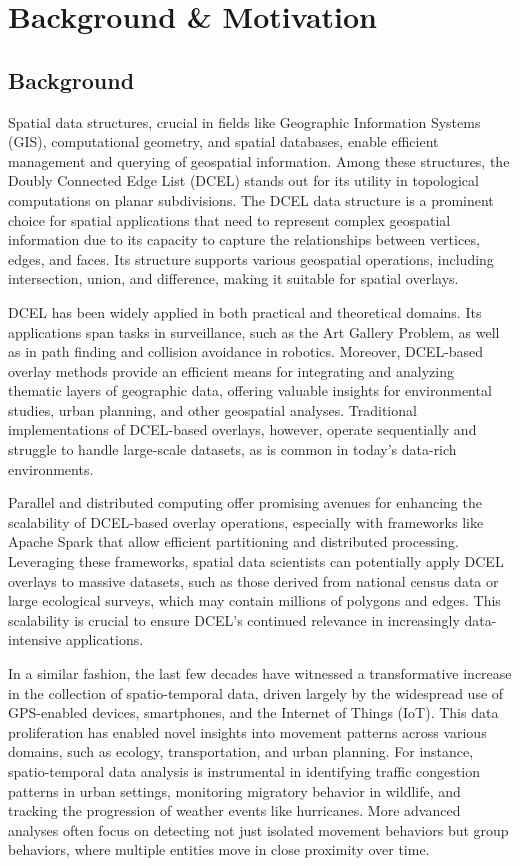 \chapter{Background \& Motivation}

\section{Background}
Spatial data structures, crucial in fields like Geographic Information Systems (GIS), computational geometry, and spatial databases, enable efficient management 
and querying of geospatial information. Among these structures, the Doubly Connected Edge List (DCEL) stands out for its utility in topological computations on 
planar subdivisions. The DCEL data structure is a prominent choice for spatial applications that need to represent complex geospatial information due to its 
capacity to capture the relationships between vertices, edges, and faces. Its structure supports various geospatial operations, 
including intersection, union, and difference, making it suitable for spatial overlays.

DCEL has been widely applied in both practical and theoretical domains. Its applications span tasks in surveillance, such as the Art Gallery Problem, as well as 
in path finding and collision avoidance in robotics. Moreover, DCEL-based overlay methods provide an efficient means for integrating and analyzing thematic 
layers of geographic data, offering valuable insights for environmental studies, urban planning, and other geospatial analyses. Traditional implementations of 
DCEL-based overlays, however, operate sequentially and struggle to handle large-scale datasets, as is common in today’s data-rich environments.

Parallel and distributed computing offer promising avenues for enhancing the scalability of DCEL-based overlay operations, especially with frameworks like 
Apache Spark that allow efficient partitioning and distributed processing. Leveraging these frameworks, spatial data scientists can potentially apply DCEL 
overlays to massive datasets, such as those derived from national census data or large ecological surveys, which may contain millions of polygons and edges. 
This scalability is crucial to ensure DCEL’s continued relevance in increasingly data-intensive applications.

In a similar fashion, the last few decades have witnessed a transformative increase in the collection of spatio-temporal data, driven largely by the widespread 
use of GPS-enabled devices, smartphones, and the Internet of Things (IoT). This data proliferation has enabled novel insights into movement patterns across 
various domains, such as ecology, transportation, and urban planning. For instance, spatio-temporal data analysis is instrumental in identifying traffic 
congestion patterns in urban settings, monitoring migratory behavior in wildlife, and tracking the progression of weather events like hurricanes. More advanced 
analyses often focus on detecting not just isolated movement behaviors but group behaviors, where multiple entities move in close proximity over time.

